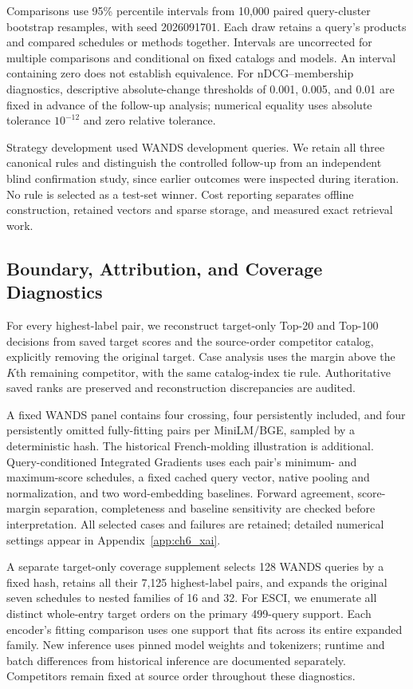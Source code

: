 Comparisons use 95\% percentile intervals from 10,000 paired query-cluster bootstrap resamples, with seed 2026091701. Each draw retains a query's products and compared schedules or methods together. Intervals are uncorrected for multiple comparisons and conditional on fixed catalogs and models. An interval containing zero does not establish equivalence. For nDCG--membership diagnostics, descriptive absolute-change thresholds of 0.001, 0.005, and 0.01 are fixed in advance of the follow-up analysis; numerical equality uses absolute tolerance $10^{-12}$ and zero relative tolerance.

Strategy development used WANDS development queries. We retain all three canonical rules and distinguish the controlled follow-up from an independent blind confirmation study, since earlier outcomes were inspected during iteration. No rule is selected as a test-set winner. Cost reporting separates offline construction, retained vectors and sparse storage, and measured exact retrieval work.

\subsection{Boundary, Attribution, and Coverage Diagnostics}
\label{sec:additional_diagnostics}

For every highest-label pair, we reconstruct target-only Top-20 and Top-100 decisions from saved target scores and the source-order competitor catalog, explicitly removing the original target. Case analysis uses the margin above the $K$th remaining competitor, with the same catalog-index tie rule. Authoritative saved ranks are preserved and reconstruction discrepancies are audited.

A fixed WANDS panel contains four crossing, four persistently included, and four persistently omitted fully-fitting pairs per MiniLM/BGE, sampled by a deterministic hash. The historical French-molding illustration is additional. Query-conditioned Integrated Gradients uses each pair's minimum- and maximum-score schedules, a fixed cached query vector, native pooling and normalization, and two word-embedding baselines. Forward agreement, score-margin separation, completeness and baseline sensitivity are checked before interpretation. All selected cases and failures are retained; detailed numerical settings appear in Appendix~\ref{app:ch6_xai}.

A separate target-only coverage supplement selects 128 WANDS queries by a fixed hash, retains all their 7,125 highest-label pairs, and expands the original seven schedules to nested families of 16 and 32. For ESCI, we enumerate all distinct whole-entry target orders on the primary 499-query support. Each encoder's fitting comparison uses one support that fits across its entire expanded family. New inference uses pinned model weights and tokenizers; runtime and batch differences from historical inference are documented separately. Competitors remain fixed at source order throughout these diagnostics.

